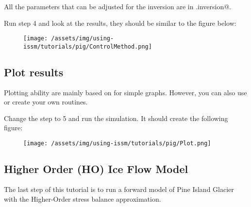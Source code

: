 All the parameters that can be adjusted for the inversion are in \verb@md.inversion@.

Run step 4 and look at the results, they should be similar to the figure below:
\begin{figure}[H]
	\begin{center}
		\texttt{[image: /assets/img/using-issm/tutorials/pig/ControlMethod.png]}
	\end{center}
\end{figure}
\subsection{Plot results}%
Plotting ability are mainly based on \verb@plotmodel@ for simple graphs. However, you can also use or create your own routines.

Change the step to 5 and run the simulation. It should create the following figure:
\begin{figure}[H]
	\begin{center}
		\texttt{[image: /assets/img/using-issm/tutorials/pig/Plot.png]}
	\end{center}
\end{figure}
\subsection{Higher Order (HO) Ice Flow Model}%
The last step of this tutorial is to run a forward model of Pine Island Glacier with the Higher-Order stress balance approximation.

